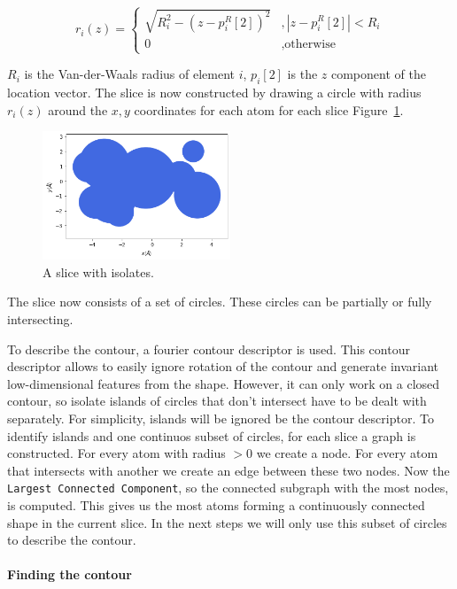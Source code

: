 $$ r_i(z) =\left\{\begin{array}{ll} \sqrt{R_i^2 - (z - p_i^R[2])^2} &, | z - p_i^R[2] |  < R_i\\
  0 &, \text{otherwise}\end{array}\right.
$$ %

$R_i$ is the Van-der-Waals radius of element $i$, $p_i[2]$ is the $z$ component of the location vector.
The slice is now constructed by drawing a circle with radius $r_i(z)$ around the $x,y$ coordinates for each atom for each slice Figure~\ref{fig:slice}.

\begin{figure} [h]
  \centering
  \includegraphics[width=0.5\textwidth]{figures/fourier/slice-iso.png} %
  \caption[Visualization of a slice with isolates]{A slice with isolates.}
  \label{fig:slice}
\end{figure}

The slice now consists of a set of circles.
These circles can be partially or fully intersecting. 

To describe the contour, a fourier contour descriptor is used.
This contour descriptor allows to easily ignore rotation of the contour and generate invariant low-dimensional features from the shape.
However, it can only work on a closed contour, so isolate islands of circles that don't intersect have to be dealt with separately.
For simplicity, islands will be ignored be the contour descriptor.
To identify islands and one continuos subset of circles, for each slice a graph is constructed.
For every atom with radius $>0$ we create a node.
For every atom that intersects with another we create an edge between these two nodes.
Now the \texttt{Largest Connected Component}, so the connected subgraph with the most nodes, is computed.
This gives us the most atoms forming a continuously connected shape in the current slice.
In the next steps we will only use this subset of circles to describe the contour.
\paragraph{Finding the contour}

